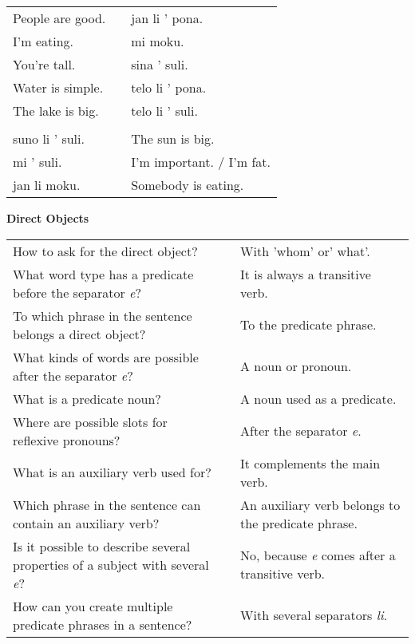 \begin{supertabular}{p{5,5cm}|ll}
People are good. && jan li ' pona. \\ %
I'm eating. && mi moku. \\ %
You're tall. && sina ' suli. \\ %
Water is simple. && telo li ' pona. \\ %
The lake is big. && telo li ' suli. \\ %
 && \\ %
suno li ' suli. && The sun is big. \\
mi ' suli. && I'm important. / I'm fat. \\
jan li moku. && Somebody is eating. \\
\end{supertabular} 

\textbf{Direct Objects} 
\label{'direct_objects_compund_sentences'}

\begin{supertabular}{p{5,5cm}|ll}
How to ask for the direct object? && With 'whom' or' what'. \\ %
What word type has a predicate before the separator \textit{e}?  && It is always a transitive verb. \\ %
To which phrase in the sentence belongs a direct object? && To the predicate phrase. \\ %
What kinds of words are possible after the separator \textit{e}?  && A noun or pronoun. \\ %
What is a predicate noun?  && A noun used as a predicate. \\ %
Where are possible slots for reflexive pronouns? && After the separator \textit{e}. \\ %
What is an auxiliary verb used for?  && It complements the main verb.  \\ %
Which phrase in the sentence can contain an auxiliary verb? && An auxiliary verb belongs to the predicate phrase.  \\ %
Is it possible to describe several properties of a subject with several \textit{e}? && No, because \textit{e} comes after a transitive verb. \\ %
How can you create multiple predicate phrases in a sentence?  && With several separators \textit{li}. \\ %
\end{supertabular} 

